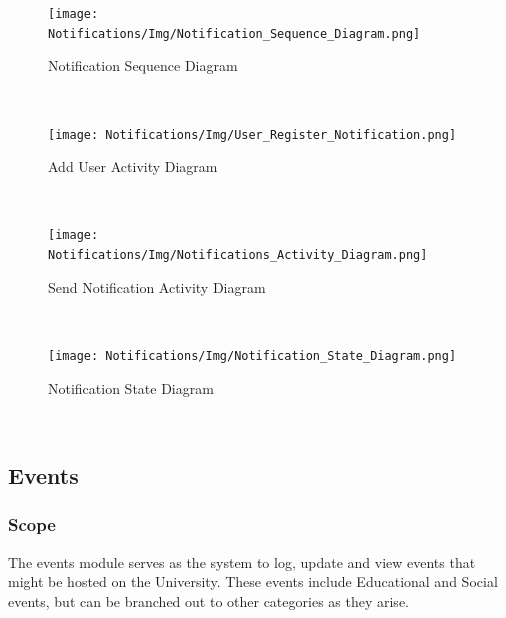 \documentclass{article}
\begin{document}
    
    \begin{figure}[h!]
        \texttt{[image: Notifications/Img/Notification\_Sequence\_Diagram.png]} \caption{Notification Sequence Diagram}
    \end{figure}
  
    
    \mbox{}\\
    \bigskip
    
    
    \begin{figure}[h!]
        \texttt{[image: Notifications/Img/User\_Register\_Notification.png]} \caption{Add User Activity Diagram}
    \end{figure}
    
    
    \mbox{}\\
    \bigskip
    
    \begin{figure}[h!]
        \texttt{[image: Notifications/Img/Notifications\_Activity\_Diagram.png]} \caption{Send Notification Activity Diagram}
    \end{figure}
    
    
    \mbox{}\\
    \bigskip
    \clearpage
    
    \begin{figure}[h!]
        \begin{center}
            \texttt{[image: Notifications/Img/Notification\_State\_Diagram.png]} \caption{Notification State Diagram}
        \end{center}
    \end{figure}
    
    \mbox{}\\
    \bigskip
    \newpage
    
\subsection{Events}
\subsubsection{Scope}
    The events module serves as the system to log, update and view events that might be hosted on the University. These events include Educational and Social events, but can be branched out to other categories as they arise.
    
\end{document}
